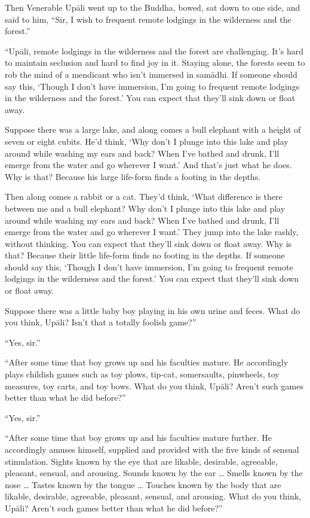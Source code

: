 \documentclass[12pt,openany]{book}%
\begin{document}
Then Venerable \textsanskrit{Upāli} went up to the Buddha, bowed, sat down to one side, and said to him, “Sir, I wish to frequent remote lodgings in the wilderness and the forest.” 

“\textsanskrit{Upāli}, remote lodgings in the wilderness and the forest are challenging. It’s hard to maintain seclusion and hard to find joy in it. Staying alone, the forests seem to rob the mind of a mendicant who isn’t immersed in \textsanskrit{samādhi}. If someone should say this, ‘Though I don’t have immersion, I’m going to frequent remote lodgings in the wilderness and the forest.’ You can expect that they’ll sink down or float away. 

Suppose there was a large lake, and along comes a bull elephant with a height of seven or eight cubits. He’d think, ‘Why don’t I plunge into this lake and play around while washing my ears and back? When I’ve bathed and drunk, I’ll emerge from the water and go wherever I want.’ And that’s just what he does. Why is that? Because his large life-form finds a footing in the depths. 

Then along comes a rabbit or a cat. They’d think, ‘What difference is there between me and a bull elephant? Why don’t I plunge into this lake and play around while washing my ears and back? When I’ve bathed and drunk, I’ll emerge from the water and go wherever I want.’ They jump into the lake rashly, without thinking. You can expect that they’ll sink down or float away. Why is that? Because their little life-form finds no footing in the depths. If someone should say this, ‘Though I don’t have immersion, I’m going to frequent remote lodgings in the wilderness and the forest.’ You can expect that they’ll sink down or float away. 

Suppose there was a little baby boy playing in his own urine and feces. What do you think, \textsanskrit{Upāli}? Isn’t that a totally foolish game?” 

“Yes, sir.” 

“After some time that boy grows up and his faculties mature. He accordingly plays childish games such as toy plows, tip-cat, somersaults, pinwheels, toy measures, toy carts, and toy bows. What do you think, \textsanskrit{Upāli}? Aren’t such games better than what he did before?” 

“Yes, sir.” 

“After some time that boy grows up and his faculties mature further. He accordingly amuses himself, supplied and provided with the five kinds of sensual stimulation. Sights known by the eye that are likable, desirable, agreeable, pleasant, sensual, and arousing. Sounds known by the ear … Smells known by the nose … Tastes known by the tongue … Touches known by the body that are likable, desirable, agreeable, pleasant, sensual, and arousing. What do you think, \textsanskrit{Upāli}? Aren’t such games better than what he did before?” 
\end{document}
